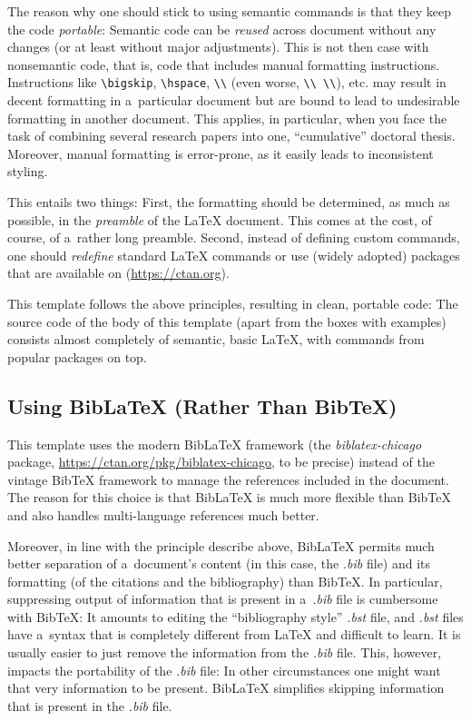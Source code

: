 The reason why one should stick to using semantic commands is that they keep the code \emph{portable}: Semantic code can be \emph{reused} across document without any changes (or at least without major adjustments). This is not then case with nonsemantic code, that is, code that includes manual formatting instructions. Instructions like \verb|\bigskip|, \verb|\hspace|, \verb|\\| (even worse, \verb|\\ \\|), etc. may result in decent formatting in a~particular document but are bound to lead to undesirable formatting in another document. This applies, in particular, when you face the task of combining several research papers into one, ``cumulative'' doctoral thesis. Moreover, manual formatting is error-prone, as it easily leads to inconsistent styling.

This entails two things: First, the formatting should be determined, as much as possible, in the \emph{preamble} of the LaTeX document. This comes at the cost, of course, of a~rather long preamble. Second, instead of defining custom commands, one should \emph{redefine} standard LaTeX commands or use (widely adopted) packages that are available on  (\url{https://ctan.org}).

This template follows the above principles, resulting in clean, portable code: The source code of the body of this template (apart from the boxes with examples) consists almost completely of semantic, basic LaTeX, with commands from popular packages on top.

\subsection{Using BibLaTeX (Rather Than BibTeX)}

This template uses the modern BibLaTeX framework (the \textit{biblatex-chicago} package, \url{https://ctan.org/pkg/biblatex-chicago}, to be precise) instead of the vintage BibTeX framework to manage the references included in the document. The reason for this choice is that BibLaTeX is much more flexible than BibTeX and also handles multi-language references much better.

Moreover, in line with the principle describe above, BibLaTeX permits much better separation of a~document's content (in this case, the \textit{.bib} file) and its formatting (of the citations and the bibliography) than BibTeX. In particular, suppressing output of information that is present in a~\textit{.bib} file is cumbersome with BibTeX: It amounts to editing the ``bibliography style'' \textit{.bst} file, and \textit{.bst} files have a~syntax that is completely different from LaTeX and difficult to learn. It is usually easier to just remove the information from the \textit{.bib} file. This, however, impacts the portability of the \textit{.bib} file: In other circumstances one might want that very information to be present. BibLaTeX simplifies skipping information that is present in the \textit{.bib} file.


